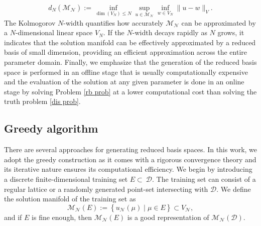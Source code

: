 \documentclass[12pt]{article}
\theoremstyle{remark}
\theoremstyle{definition}
\numberwithin{equation}{section}
\begin{document}
\begin{equation}
    d_N(\mathcal{M}_{\mathcal{N}}):= \inf _{\operatorname{dim}\left(V_N\right) \leq N} \sup _{u \in \mathcal{M}_{\mathcal{N}}} \inf _{w \in V_N}\|u-w\|_V.
\end{equation}
The Kolmogorov $N$-width quantifies how accurately $\mathcal{M}_{\mathcal{N}}$ can be approximated by a $N$-dimensional linear space $V_{N}$. If the $N$-width decays rapidly as $N$ grows, it indicates that the solution manifold can be effectively approximated by a reduced basis of small dimension, providing an efficient approximation across the entire parameter domain. Finally, we emphasize that the generation of the reduced basis space is performed in an offline stage that is usually computationally expensive and the evaluation of the solution at any given parameter is done in an online stage by solving Problem \eqref{rb prob} at a lower computational cost than solving the truth problem \eqref{dis prob}.

\subsection{Greedy algorithm}
There are several approaches for generating reduced basis spaces. In this work, we adopt the greedy construction as it comes with a rigorous convergence theory \cite{binev2011convergence,devore2013greedy} and its iterative nature ensures its computational efficiency. We begin by introducing a discrete finite-dimensional training set $E\subset\ \mathcal{D}$. The training set can consist of a regular lattice or a randomly generated point-set intersecting with $\mathcal{D}$. We define the solution manifold of the training set as 
\begin{equation}
    \mathcal{M}_{\mathcal{N}}(E):=\left\{u_{\mathcal{N}}(\mu) \mid \mu \in E\right\} \subset V_{\mathcal{N}},
\end{equation}
and if $E$ is fine enough, then $\mathcal{M}_{\mathcal{N}}(E)$ is a good representation of $\mathcal{M}_{\mathcal{N}}(\mathcal{D})$. 
\end{document}
